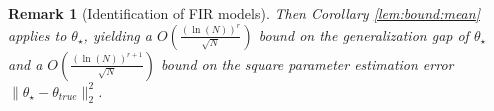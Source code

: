 \documentclass{article}
\def\rvu{{\mathbf{i}}}
\def\rvu{{\mathbf{u}}}
\def\rvy{{\mathbf{y}}}
\newtheorem{remark}[theorem]{Remark}
\begin{document}
\begin{remark}[Identification of FIR models]
 Then Corollary \ref{lem:bound:mean} applies to $\theta_{\star}$,
  yielding  a 
  $O(\frac{(\ln(N))^r}{\sqrt{N}})$ bound on
  the generalization gap of $\theta_{\star}$
  and a $O(\frac{(\ln(N))^{r+1}}{\sqrt{N}})$ bound
  on the square parameter estimation error
  $\|\theta_{\star}-\theta_{true}\|_2^2$.
  \end{remark}
\end{document}
